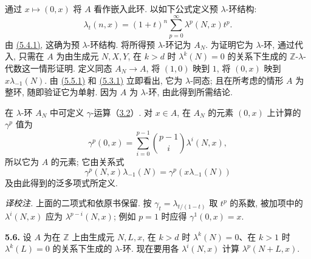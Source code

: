 通过 \(x\mapsto(0,x)\) 将 \(A\) 看作嵌入此环. 以如下公式定义预 \(\lambda\)-环结构:
\begin{equation}\tag{5.5.3}
 \lambda_t(n,x)=(1+t)^n\sum_{p=0}^{\infty}\lambda^p(N,x)t^p.
\end{equation}
由 \hyperlink{sga6.e05.eq.5-4-1}{(5.4.1)}, 这确为预 \(\lambda\)-环结构. 将所得预 \(\lambda\)-环记为 \(A_N\). 为证明它为 \(\lambda\)-环, 通过代入, 只需在 \(A\) 为由生成元 \(N,X,Y\), 在 \(k>d\) 时 \(\lambda^k(N)=0\) 的关系下生成的 \(\mathbb Z\)-\(\lambda\)-代数这一情形证明. 定义同态 \(A_N\to A\), 将 \((1,0)\) 映到 \(1\), 将 \((0,x)\) 映到 \(x\lambda_{-1}(N)\). 由 \hyperlink{sga6.e05.eq.5-5-1}{(5.5.1)} 和 \hyperlink{sga6.e05.eq.5-3-1}{(5.3.1)} 立即看出, 它为 \(\lambda\)-同态; 且在所考虑的情形 \(A\) 为整环, 随即验证它为单射. 因为 \(A\) 为 \(\lambda\)-环, 由此得到所需结论.

在 \(\lambda\)-环 \(A_N\) 中可定义 \(\gamma\)-运算（\hyperlink{sga6.e05.prop.3-2}{3.2}）. 对 \(x\in A\), 在 \(A_N\) 的元素 \((0,x)\) 上计算的 \(\gamma^p\) 值为
\[
 \gamma^p(0,x)=\sum_{i=0}^{p-1}\binom{p-1}{i}\lambda^i(N,x),
\]
所以它为 \(A\) 的元素; 它由关系式
\begin{equation}\tag{5.5.4}
 \gamma^p(N,x)\lambda_{-1}(N)=\gamma^p(x\lambda_{-1}(N))
\end{equation}
及由此得到的泛多项式所定义.

\emph{译校注.} 上面的二项式和依原书保留. 按 \(\gamma_t=\lambda_{t/(1-t)}\) 取 \(t^p\) 的系数, 被加项中的 \(\lambda^i(N,x)\) 应为 \(\lambda^{p-i}(N,x)\); 例如 \(p=1\) 时应得 \(\gamma^1(0,x)=x\).

\textbf{5.6.} 设 \(A\) 为在 \(\mathbb Z\) 上由生成元 \(N,L,x\), 在 \(k>d\) 时 \(\lambda^k(N)=0\)、在 \(k>1\) 时 \(\lambda^k(L)=0\) 的关系下生成的 \(\lambda\)-环. 现在要用各 \(\lambda^i(N,x)\) 计算 \(\lambda^p(N+L,x)\).


